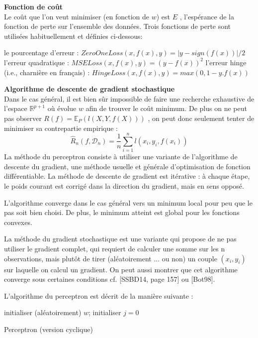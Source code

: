 \documentclass[a4paper]{article}
\theoremstyle{plain}
\begin{document}
\textbf{Fonction de coût}\\

Le coût que l’on veut minimiser (en fonction de $w$) est $ E $
, l’espérance de la fonction de perte sur l’ensemble des données. Trois fonctions de perte sont utilisées habituellement et définies ci-dessous:
\begin{outline}
\1 le pourcentage d’erreur : $ZeroOneLoss(x,f(x),y) = |y-sign(f(x))|/2$
\1 l’erreur quadratique : $MSELoss(x,f(x),y) = (y -f(x))^2$
\1 l’erreur hinge (i.e., charnière en français) : $HingeLoss(x,f(x),y) = max(0,1-y.f(x))$ 
\end{outline}

\textbf{Algorithme de descente de gradient stochastique}\\

Dans le cas général, il est bien sûr impossible de faire une recherche exhaustive de l’espace $\mathbb{R}^{p+1}$ où
évolue $w$ afin de trouver le coût minimum. De plus on ne peut pas observer $R(f) = \mathbb{E}_P(l(X,Y,f(X))) $ , on peut donc
seulement tenter de minimiser sa contrepartie empirique :
$$\hat R_n(f, \mathcal{D}_n) = \frac{1}{n}\sum_{i=1}^{n}\mathit{l}(x_i,y_i,f(x_i))$$
La méthode du perceptron consiste à utiliser une variante de l’algorithme de descente du gradient, une méthode usuelle et générale d’optimisation de fonction différentiable. La méthode de descente de gradient est itérative : à chaque étape, le poids courant est corrigé dans la direction du gradient, mais en
sens opposé. 

L’algorithme converge dans le cas général vers un minimum local pour peu que le pas soit bien choisi. De plus, le minimum atteint est global pour les fonctions convexes.

La méthode du gradient stochastique est une variante qui propose de ne pas utiliser le gradient complet, qui requiert de calculer une somme sur les n observations, mais plutôt de tirer (aléatoirement ... ou non) un couple $(x_i, y_i)$ sur laquelle on calcul un gradient. On peut aussi montrer que cet algorithme
converge sous certaines conditions cf. [SSBD14, page 157] ou [Bot98].

L’algorithme du perceptron est décrit de la manière suivante :\\



\begin{algorithm}[H]
 initialiser (aléatoirement) $w$; initialiser $j = 0$\
 
 \caption{Perceptron (version cyclique)}

\end{algorithm}
\end{document}
